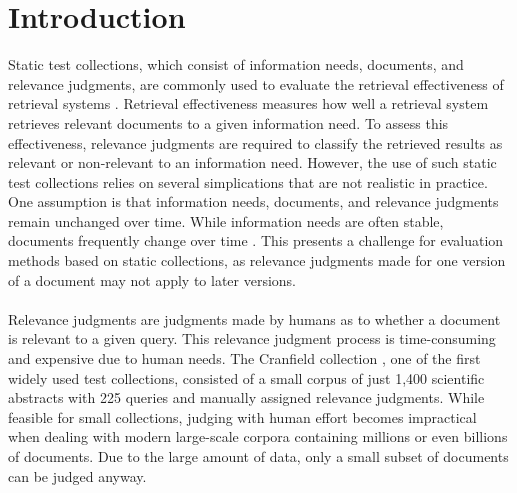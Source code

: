 \chapter{Introduction}\label{introduction} 

Static test collections, which consist of information needs, documents, and relevance judgments, are commonly used to evaluate the retrieval effectiveness of retrieval systems \citep{sanderson:2010}. Retrieval effectiveness measures how well a retrieval system retrieves relevant documents to a given information need. To assess this effectiveness, relevance judgments are required to classify the retrieved results as relevant or non-relevant to an information need. However, the use of such static test collections relies on several simplications that are not realistic in practice. One assumption is that information needs, documents, and relevance judgments remain unchanged over time. While information needs are often stable, documents frequently change over time \citep{cho:2000}. This presents a challenge for evaluation methods based on static collections, as relevance judgments made for one version of a document may not apply to later versions.
\\\\
Relevance judgments are judgments made by humans as to whether a document is relevant to a given query. This relevance judgment process is time-consuming and expensive due to human needs. The Cranfield collection \citep{cleverdon:91}, one of the first widely used test collections, consisted of a small corpus of just 1,400 scientific abstracts with 225 queries and manually assigned relevance judgments. While feasible for small collections, judging with human effort becomes impractical when dealing with modern large-scale corpora containing millions or even billions of documents. Due to the large amount of data, only a small subset of documents can be judged anyway. 
\\\\\\\\\\\\
